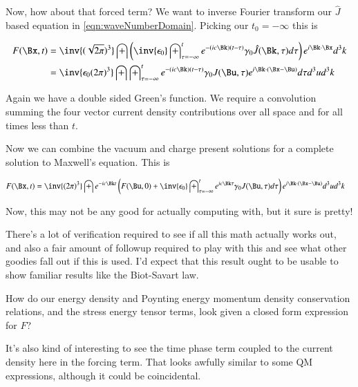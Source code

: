 \documentclass{article}
\begin{document}
Now, how about that forced term?  We want to inverse Fourier transform our $\hat{J}$ based equation in \ref{eqn:waveNumberDomain}.  Picking our $t_0 = -\infty$ this is

\begin{align*}
F(\Bx,t) 
&=
\inv{(\sqrt{2\pi})^3} \int 
\left( \inv{\epsilon_0} \int_{\tau = -\infty}^{t} e^{-(i c \Bk) (t -\tau)} \gamma_0 \hat{J}(\Bk,\tau) d\tau  \right) e^{i \Bk \cdot \Bx} d^3 k \\
&=
\inv{\epsilon_0 ({2\pi})^3} \int 
\int_{\tau = -\infty}^{t} e^{-(i c \Bk) (t -\tau)} \gamma_0 {J}(\Bu,\tau) 
e^{i \Bk \cdot (\Bx-\Bu)} 
d\tau  
d^3 u
d^3 k
\end{align*}

Again we have a double sided Green's function.  We require a convolution summing the four vector current density contributions over all space and for all times less than $t$.

Now we can combine the vacuum and charge present solutions for a complete solution to Maxwell's equation.  This is

\begin{align}
F(\Bx,t) 
&=
\inv{({2\pi})^3} \int 
e^{-i c \Bk t}
\left(
F(\Bu, 0) + \inv{\epsilon_0} \int_{\tau = -\infty}^{t} e^{i c \Bk \tau } \gamma_0 J(\Bu,\tau)  d\tau  
\right)
e^{i \Bk \cdot (\Bx-\Bu)} 
d^3 u
d^3 k
\end{align}

Now, this may not be any good for actually computing with, but it sure is pretty!

There's a lot of verification required to see if all this math actually works out, and
also a fair amount of followup required to play with this and see what other goodies fall out if this is used.  I'd expect that this result ought to be usable to show familiar
results like the Biot-Savart law.

How do our energy density and Poynting energy momentum density conservation relations, and the stress energy tensor terms, look given a closed form expression for $F$?

It's also kind of interesting to see the time phase term coupled to the current density here in the forcing term.  That looks awfully similar to some QM expressions, although it
could be coincidental.



\end{document}
